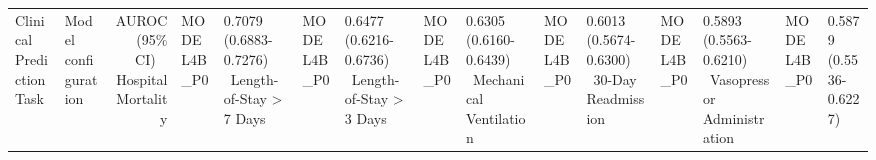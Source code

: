 \documentclass[border=0pt]{standalone}
\begin{document}
\begin{adjustbox}{width=\textwidth}
\begin{tabular}{@{}llr@{}}
\toprule
Clinical Prediction Task & Model configuration & AUROC (95\% CI) \
\midrule
Hospital Mortality & MODEL4B\_P0 & 0.7079 (0.6883-0.7276) \
Length-of-Stay > 7 Days & MODEL4B\_P0 & 0.6477 (0.6216-0.6736) \
Length-of-Stay > 3 Days & MODEL4B\_P0 & 0.6305 (0.6160-0.6439) \
Mechanical Ventilation & MODEL4B\_P0 & 0.6013 (0.5674-0.6300) \
30-Day Readmission & MODEL4B\_P0 & 0.5893 (0.5563-0.6210) \
Vasopressor Administration & MODEL4B\_P0 & 0.5879 (0.5536-0.6227) \
\bottomrule
\end{tabular}
\end{adjustbox}
\end{document}
